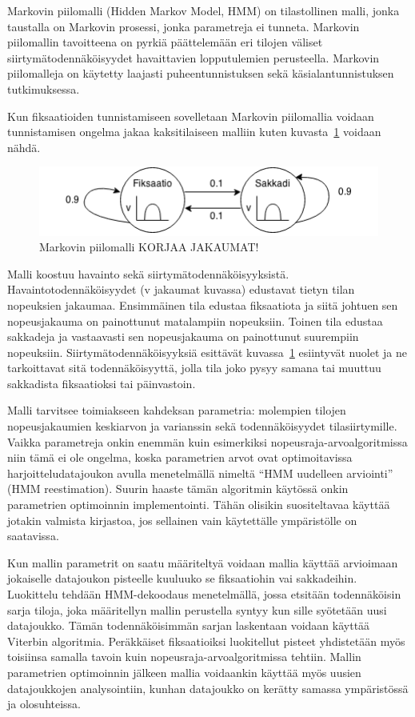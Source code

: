 Markovin piilomalli (Hidden Markov Model, HMM) on tilastollinen malli, jonka taustalla on Markovin prosessi, jonka parametreja ei tunneta. Markovin piilomallin tavoitteena on pyrkiä päättelemään eri tilojen väliset siirtymätodennäköisyydet havaittavien lopputulemien perusteella. Markovin piilomalleja on käytetty laajasti puheentunnistuksen sekä käsialantunnistuksen tutkimuksessa.\citep[s. 257-286]{rabiner1989tutorial}

Kun fiksaatioiden tunnistamiseen sovelletaan Markovin piilomallia voidaan tunnistamisen ongelma jakaa kaksitilaiseen malliin kuten kuvasta~\ref{fig:hmm_sample} voidaan nähdä. 

\begin{figure}[h]
    \includegraphics[width=1.0\textwidth]{HMM.png}
		\caption{Markovin piilomalli KORJAA JAKAUMAT!}
		\label{fig:hmm_sample}
\end{figure}

Malli koostuu havainto sekä siirtymätodennäköisyyksistä. Havaintotodennäköisyydet (v jakaumat kuvassa) edustavat tietyn tilan nopeuksien jakaumaa. Ensimmäinen tila edustaa fiksaatiota ja siitä johtuen sen nopeusjakauma on painottunut matalampiin nopeuksiin. Toinen tila edustaa sakkadeja ja vastaavasti sen nopeusjakauma on painottunut suurempiin nopeuksiin. Siirtymätodennäköisyyksiä esittävät kuvassa~\ref{fig:hmm_sample} esiintyvät nuolet ja ne tarkoittavat sitä todennäköisyyttä, jolla tila joko pysyy samana tai muuttuu sakkadista fiksaatioksi tai päinvastoin.

Malli tarvitsee toimiakseen kahdeksan parametria: molempien tilojen nopeusjakaumien keskiarvon ja varianssin sekä todennäköisyydet tilasiirtymille. Vaikka parametreja onkin enemmän kuin esimerkiksi nopeusraja-arvoalgoritmissa niin tämä ei ole ongelma, koska parametrien arvot ovat optimoitavissa harjoitteludatajoukon avulla menetelmällä nimeltä ``HMM uudelleen arviointi'' (HMM reestimation).\citep[s. 180]{salvucci1999} Suurin haaste tämän algoritmin käytössä onkin parametrien optimoinnin implementointi. Tähän olisikin suositeltavaa käyttää jotakin valmista kirjastoa, jos sellainen vain käytettälle ympäristölle on saatavissa.

Kun mallin parametrit on saatu määriteltyä voidaan mallia käyttää arvioimaan jokaiselle datajoukon pisteelle kuuluuko se fiksaatiohin vai sakkadeihin. Luokittelu tehdään HMM-dekoodaus menetelmällä, jossa etsitään todennäköisin sarja tiloja, joka määritellyn mallin perustella syntyy kun sille syötetään uusi datajoukko. Tämän todennäköisimmän sarjan laskentaan voidaan käyttää Viterbin algoritmia.\citep[s. 178]{salvucci1999}  Peräkkäiset fiksaatioiksi luokitellut pisteet yhdistetään myös toisiinsa samalla tavoin kuin nopeusraja-arvoalgoritmissa tehtiin.\citep[s. 31]{salvucci1999} Mallin parametrien optimoinnin jälkeen mallia voidaankin käyttää myös uusien datajoukkojen analysointiin, kunhan datajoukko on kerätty samassa ympäristössä ja olosuhteissa.

